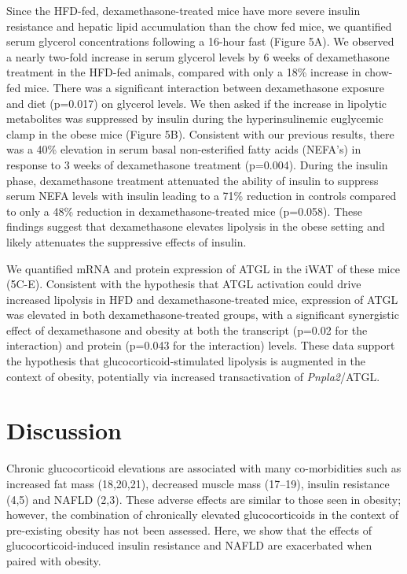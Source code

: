 \documentclass[11pt]{article} %
\begin{document}
Since the HFD-fed, dexamethasone-treated mice have more severe insulin
resistance and hepatic lipid accumulation than the chow fed mice, we
quantified serum glycerol concentrations following a 16-hour fast
(Figure 5A). We observed a nearly two-fold increase in serum glycerol
levels by 6 weeks of dexamethasone treatment in the HFD-fed animals,
compared with only a 18\% increase in chow-fed mice. There was a
significant interaction between dexamethasone exposure and diet
(p=0.017) on glycerol levels. We then asked if the increase in lipolytic
metabolites was suppressed by insulin during the hyperinsulinemic
euglycemic clamp in the obese mice (Figure 5B). Consistent with our
previous results, there was a 40\% elevation in serum basal
non-esterified fatty acids (NEFA's) in response to 3 weeks of
dexamethasone treatment (p=0.004). During the insulin phase,
dexamethasone treatment attenuated the ability of insulin to suppress
serum NEFA levels with insulin leading to a 71\% reduction in controls
compared to only a 48\% reduction in dexamethasone-treated mice
(p=0.058). These findings suggest that dexamethasone elevates lipolysis
in the obese setting and likely attenuates the suppressive effects of
insulin.

We quantified mRNA and protein expression of ATGL in the iWAT of these
mice (5C-E). Consistent with the hypothesis that ATGL activation could
drive increased lipolysis in HFD and dexamethasone-treated mice,
expression of ATGL was elevated in both dexamethasone-treated groups,
with a significant synergistic effect of dexamethasone and obesity at
both the transcript (p=0.02 for the interaction) and protein (p=0.043
for the interaction) levels. These data support the hypothesis that
glucocorticoid-stimulated lipolysis is augmented in the context of
obesity, potentially via increased transactivation of \textit{Pnpla2}/ATGL.

\section*{Discussion}

Chronic glucocorticoid elevations are associated with many
co-morbidities such as increased fat mass (18,20,21), decreased muscle
mass (17--19), insulin resistance (4,5) and NAFLD (2,3). These adverse
effects are similar to those seen in obesity; however, the combination
of chronically elevated glucocorticoids in the context of pre-existing
obesity has not been assessed. Here, we show that the effects of
glucocorticoid-induced insulin resistance and NAFLD are exacerbated when
paired with obesity.
\end{document}
